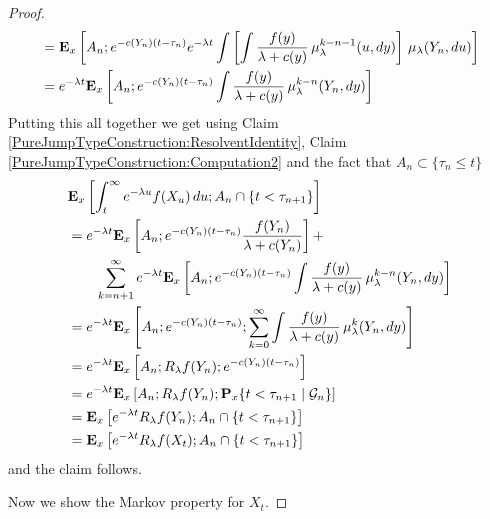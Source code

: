\begin{proof}
\begin{align*}
&=\sexpectation{ A_n ; e^{-c(Y_n)(t - \tau_n)} e^{-\lambda t} \int \left [ \int \frac{f(y)}{\lambda + c(y)} \,  \mu^{k-n-1}_\lambda(u, dy) \right] \, \mu_\lambda(Y_n, du)}{x} \\
&=e^{-\lambda t} \sexpectation{ A_n ; e^{-c(Y_n)(t - \tau_n)} \int \frac{f(y)}{\lambda + c(y)} \,  \mu^{k-n}_\lambda(Y_n, dy)}{x} \\
\end{align*}
Putting this all together we get using Claim \ref{PureJumpTypeConstruction:ResolventIdentity}, Claim \ref{PureJumpTypeConstruction:Computation2} and the fact that $A_n \subset \lbrace \tau_n \leq t \rbrace$ 
\begin{align*}
&\sexpectation{\int_t^\infty e^{-\lambda u} f(X_u) \, du ; A_n \cap \lbrace t < \tau_{n+1} \rbrace}{x}  \\
&= e^{-\lambda t} \sexpectation{ A_n ; e^{-c(Y_n)(t - \tau_{n})} \frac{f(Y_n)}{\lambda + c(Y_n)}}{x} +\\
&\qquad \sum_{k=n+1}^\infty e^{-\lambda t} \sexpectation{ A_n ; e^{-c(Y_n)(t - \tau_n)} \int \frac{f(y)}{\lambda + c(y)} \,  \mu^{k-n}_\lambda(Y_n, dy)}{x} \\
&=e^{-\lambda t}\sexpectation{ A_n ; e^{-c(Y_n)(t - \tau_n)} ; \sum_{k=0}^\infty \int \frac{f(y)}{\lambda + c(y)} \,  \mu^{k}_\lambda(Y_n, dy)}{x}\\
&=e^{-\lambda t} \sexpectation{A_n ; R_\lambda f(Y_n) ; e^{-c(Y_n)(t - \tau_n)} }{x} \\
&=e^{-\lambda t} \sexpectation{A_n  ; R_\lambda f(Y_n); \csprobability{\mathcal{G}_n}{t < \tau_{n+1} }{x}}{x} \\
&=\sexpectation{e^{-\lambda t} R_\lambda f(Y_n); A_n \cap \lbrace t < \tau_{n+1} \rbrace}{x} \\
&=\sexpectation{e^{-\lambda t} R_\lambda f(X_t); A_n \cap \lbrace t < \tau_{n+1} \rbrace}{x} \\
\end{align*}
and the claim follows.

Now we show the Markov property for $X_t$.  


\end{proof}
